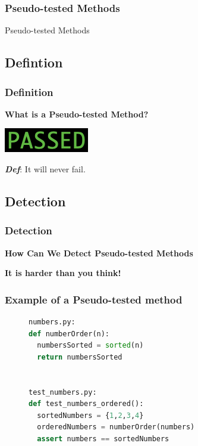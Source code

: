 \begin{frame}
	\frametitle{Pseudo-tested Methods}
	\begin{center}
    \huge{Pseudo-tested Methods}
  \end{center}
\end{frame}

\subsection{Defintion}
\begin{frame}
  \frametitle{Definition}
    \begin{center}
      \textbf{What is a Pseudo-tested Method?}

      \vspace{10mm}
      \includegraphics{images/passing}

      \vspace{10mm}
      \textbf{\textit{Def}}: It will never fail.
    \end{center}
\end{frame}

\subsection{Detection}
\begin{frame}
  \frametitle{Detection}
    \begin{center}
      \textbf{How Can We Detect Pseudo-tested Methods}

			\vspace{20mm}
			\textbf{It is harder than you think!}

    \end{center}
\end{frame}

\begin{frame}[fragile]
\frametitle{Example of a Pseudo-tested method}
	\begin{figure}[t!, scale = .75]
	\begin{lstlisting}[language = Python, basicstyle=\small, backgroundcolor = \color{lightgray}]
numbers.py:
def numberOrder(n):
  numbersSorted = sorted(n)
  return numbersSorted


test_numbers.py:
def test_numbers_ordered():
  sortedNumbers = {1,2,3,4}
  orderedNumbers = numberOrder(numbers)
  assert numbers == sortedNumbers
	\end{lstlisting}
	\end{figure}
\end{frame}
